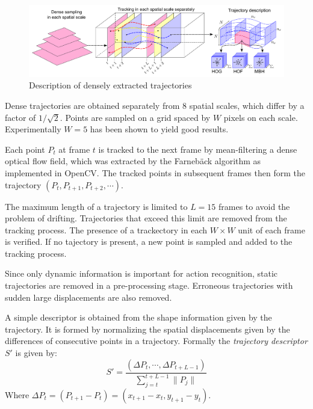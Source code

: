 \begin{figure}[H]
    \centering
    \includegraphics[width=\textwidth]{img_conventional/densetrajectories_approach}
    \caption{Description of densely extracted trajectories \cite{wang_action_2011}}
    \label{fig:densetrajectories_approach}
\end{figure}

Dense trajectories are obtained separately from 8 spatial scales, which differ by a factor of $1 / \sqrt{2}$.
Points are sampled on a grid spaced by $W$ pixels on each scale. Experimentally $W = 5$ has been shown to yield good results.

Each point $P_t$ at frame $t$ is tracked to the next frame by mean-filtering a dense optical flow field, which was extracted by the Farnebäck algorithm \cite{farneback_two-frame_2003} as implemented in OpenCV.
The tracked points in subsequent frames then form the trajectory $(P_t, P_{t+1}, P_{t+2}, \cdots)$.

The maximum length of a trajectory is limited to $L = 15$ frames to avoid the problem of drifting.
Trajectories that exceed this limit are removed from the tracking process.
The presence of a trackectory in each $W \times W$ unit of each frame is verified. If no tajectory is present, a new point is sampled and added to the tracking process.

Since only dynamic information is important for action recognition, static trajectories are removed in a pre-processing stage.
Erroneous trajectories with sudden large displacements are also removed.

A simple descriptor is obtained from the shape information given by the trajectory.
It is formed by normalizing the spatial displacements given by the differences of consecutive points in a trajectory.
Formally the \textit{trajectory descriptor} $S'$ is given by:
\begin{equation*}
    S' = \frac{(\Delta P_t, \cdots, \Delta P_{t+L-1})}{\sum_{j=t}^{t+L-1} \|P_j\|}
\end{equation*}
Where $\Delta P_t = (P_{t+1} - P_t) = (x_{t+1} - x_t, y_{t+1} - y_t)$.

